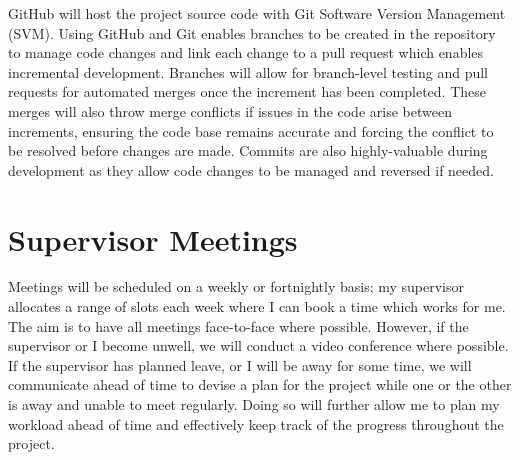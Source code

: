 GitHub will host the project source code with Git Software Version Management (SVM). Using GitHub and Git enables branches to be created in the repository to manage code changes and link each change to a pull request which enables incremental development. Branches will allow for branch-level testing and pull requests for automated merges once the increment has been completed. These merges will also throw merge conflicts if issues in the code arise between increments, ensuring the code base remains accurate and forcing the conflict to be resolved before changes are made. Commits are also highly-valuable during development as they allow code changes to be managed and reversed if needed. 

\section{Supervisor Meetings}
\label{pm:supervisor_meetings}

Meetings will be scheduled on a weekly or fortnightly basis; my supervisor allocates a range of slots each week where I can book a time which works for me. The aim is to have all meetings face-to-face where possible. However, if the supervisor or I become unwell, we will conduct a video conference where possible. If the supervisor has planned leave, or I will be away for some time, we will communicate ahead of time to devise a plan for the project while one or the other is away and unable to meet regularly. Doing so will further allow me to plan my workload ahead of time and effectively keep track of the progress throughout the project.